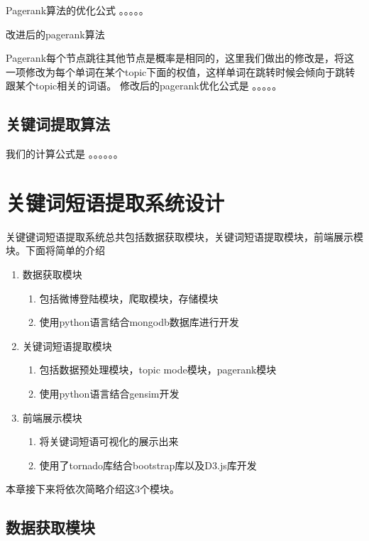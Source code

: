 \documentclass[master]{njuthesis}
\begin{document}
Pagerank算法的优化公式
。。。。。

改进后的pagerank算法

Pagerank每个节点跳往其他节点是概率是相同的，这里我们做出的修改是，将这一项修改为每个单词在某个topic下面的权值，这样单词在跳转时候会倾向于跳转跟某个topic相关的词语。
修改后的pagerank优化公式是
。。。。。

\subsection{关键词提取算法}

我们的计算公式是
。。。。。。

\section{关键词短语提取系统设计}

    关键键词短语提取系统总共包括数据获取模块，关键词短语提取模块，前端展示模块。下面将简单的介绍
    
    \begin{enumerate}
      \item 数据获取模块
	\begin{enumerate}
	   \item 包括微博登陆模块，爬取模块，存储模块
	   \item 使用python语言结合mongodb数据库进行开发
        \end{enumerate}
     \item 关键词短语提取模块
       \begin{enumerate}
	 \item 包括数据预处理模块，topic mode模块，pagerank模块
         \item 使用python语言结合gensim开发
       \end{enumerate}
     \item  前端展示模块
       \begin{enumerate} 
         \item 将关键词短语可视化的展示出来
         \item 使用了tornado库结合bootstrap库以及D3.js库开发
       \end{enumerate}
    \end{enumerate}

    本章接下来将依次简略介绍这3个模块。

\subsection{数据获取模块}
   
\end{document}
